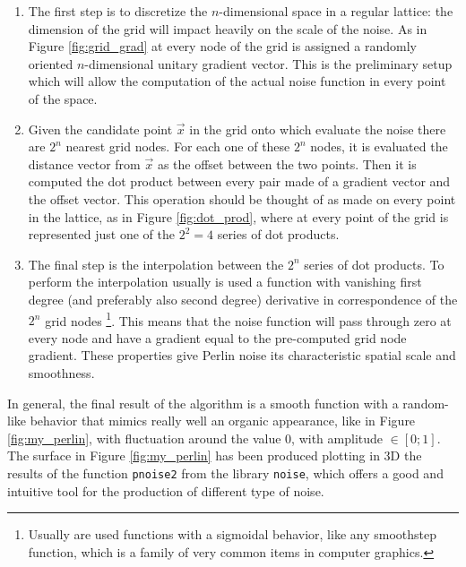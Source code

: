 \begin{enumerate}
    \item The first step is to discretize the $n$-dimensional space in a regular lattice: the dimension of the grid will impact heavily on the scale of the noise. As in Figure \ref{fig:grid_grad} at every node of the grid is assigned a randomly oriented $n$-dimensional unitary gradient vector. This is the preliminary setup which will allow the computation of the actual noise function in every point of the space.

    \item Given the candidate point $\vec x$ in the grid onto which evaluate the noise there are $2^n$ nearest grid nodes. For each one of these $2^n$ nodes, it is evaluated the distance vector from $\vec x$ as the offset between the two points. Then it is computed the dot product between every pair made of a gradient vector and the offset vector. This operation should be thought of as made on every point in the lattice, as in Figure \ref{fig:dot_prod}, where at every point of the grid is represented just one of the $2^2 = 4$ series of dot products.

    \item The final step is the interpolation between the $2^n$ series of dot products. To perform the interpolation usually is used a function with vanishing first degree (and preferably also second degree) derivative in correspondence of the $2^n$ grid nodes \footnote{Usually are used functions with a sigmoidal behavior, like any smoothstep function, which is a family of very common items in computer graphics.}. This means that the noise function will pass through zero at every node and have a gradient equal to the pre-computed grid node gradient. These properties give Perlin noise its characteristic spatial scale and smoothness.
\end{enumerate}

In general, the final result of the algorithm is a smooth function with a random-like behavior that mimics really well an organic appearance, like in Figure \ref{fig:my_perlin}, with fluctuation around the value 0, with amplitude $ \in [ 0;1] $. The surface in Figure \ref{fig:my_perlin} has been produced plotting in 3D the results of the function \texttt{pnoise2} from the library \texttt{noise}, which offers a good and intuitive tool for the production of different type of noise.

